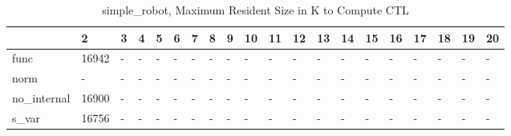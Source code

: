 \begin{table}
\caption{simple_robot, Maximum Resident Size in K to Compute CTL}
\label{simple_robot_CTL_size}
\begin{tabular}{llllllllllllllllllll}
\toprule
 & 2 & 3 & 4 & 5 & 6 & 7 & 8 & 9 & 10 & 11 & 12 & 13 & 14 & 15 & 16 & 17 & 18 & 19 & 20 \\
\midrule
func & 16942 & - & - & - & - & - & - & - & - & - & - & - & - & - & - & - & - & - & - \\
norm & - & - & - & - & - & - & - & - & - & - & - & - & - & - & - & - & - & - & - \\
no_internal & 16900 & - & - & - & - & - & - & - & - & - & - & - & - & - & - & - & - & - & - \\
s_var & 16756 & - & - & - & - & - & - & - & - & - & - & - & - & - & - & - & - & - & - \\
\bottomrule
\end{tabular}
\end{table}
